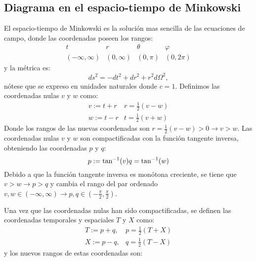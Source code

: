 \subsection{Diagrama en el espacio-tiempo de Minkowski}
El espacio-tiempo de Minkowski es la solución mas sencilla de las ecuaciones de campo, donde las coordenadas poseen los rangos:
\begin{equation}
    \begin{array}{c|c|c|c}
        t                  & r           & \theta   & \varphi   \\
        ( -\infty, \infty) & (0, \infty) & (0, \pi) & (0, 2\pi)
    \end{array}
\end{equation}
y la métrica es:
\begin{equation}
    ds^2 = -dt^2 + dr^2 + r^2 d\Omega^2,
\end{equation}
nótese  que se expreso en unidades naturales donde $c=1$.
Definimos las coordenadas nulas $v$ y $w$ como:
$$
    \begin{array}{ll}
        v:=t+r & r = \frac{1}{2}(v-w) \\
        w:=t-r & t = \frac{1}{2}(v+w)
    \end{array}
$$
Donde los rangos de las nuevas coordenadas son  $r=\frac{1}{2}(v-w)>0 \longrightarrow v>w$.
Las coordenadas nulas $v$ y $w$ son compactificadas con la función tangente inversa, obteniendo las coordenadas $p$ y $q$:
$$ p:=\tan ^{-1}(v) \\
    q =\tan ^{-1}(w)
$$
Debido a que la función tangente inversa es monótona creciente, se tiene que $v>w \longrightarrow p>q$ y cambia el rango del par ordenado $v,w \in (-\infty, \infty) \longrightarrow p,q \in \left(-\frac{\pi}{2}, \frac{\pi}{2}\right)$.

Una vez que las coordenadas nulas han sido compactificadas, se definen las coordenadas temporales y espaciales $T$ y $X$ como:
$$
    \begin{array}{ll}
        T:=p+q, & p = \frac{1}{2} (T + X) \\
        X:=p-q, & q = \frac{1}{2} (T - X)
    \end{array}
$$
y los nuevos rangos de estas coordenadas son:

